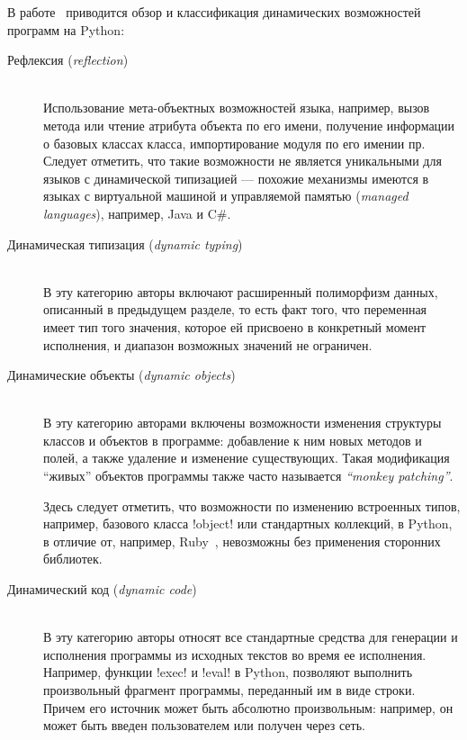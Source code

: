 В работе~\cite{Holkner2009} приводится обзор и классификация динамических
возможностей программ на Python: 

\begin{description}
  \item[Рефлексия (\emph{reflection})] \hfill \\ 
      Использование мета-объектных возможностей языка, например,
      вызов метода или чтение атрибута объекта по его имени, получение
      информации о базовых классах класса, импортирование модуля по его имении
      пр. Следует отметить, что такие возможности не является уникальными для
      языков с динамической типизацией --- похожие механизмы имеются в языках с
      виртуальной машиной и управляемой памятью (\emph{managed languages}),
      например, Java и C\#.

      \newpage
  \item[Динамическая типизация (\emph{dynamic typing})] \hfill \\ 
      В эту категорию авторы включают расширенный полиморфизм данных, описанный
      в предыдущем разделе, то есть факт того, что переменная имеет тип того
      значения, которое ей присвоено в конкретный момент исполнения, и диапазон
      возможных значений не ограничен.

  \item[Динамические объекты (\emph{dynamic objects})] \hfill \\ 
      В эту категорию авторами включены возможности изменения структуры классов
      и объектов в программе: добавление к ним новых методов и полей, а также
      удаление и изменение существующих. Такая модификация ``живых'' объектов
      программы также часто называется \emph{``monkey patching''}.

      Здесь следует отметить, что возможности по изменению встроенных
      типов, например, базового класса !object! или стандартных коллекций, в Python, в
      отличие от, например, Ruby~\cite{Madsen2007}, невозможны без применения сторонних библиотек.
      
  \item[Динамический код (\emph{dynamic code})] \hfill \\ 
      В эту категорию авторы относят все стандартные средства для генерации и
      исполнения программы из исходных текстов во время ее исполнения.
      Например, функции !exec! и !eval! в Python, позволяют выполнить
      произвольный фрагмент программы, переданный им в виде строки.  Причем его
      источник может быть абсолютно произвольным: например, он может быть введен
      пользователем или получен через сеть.


\end{description}
